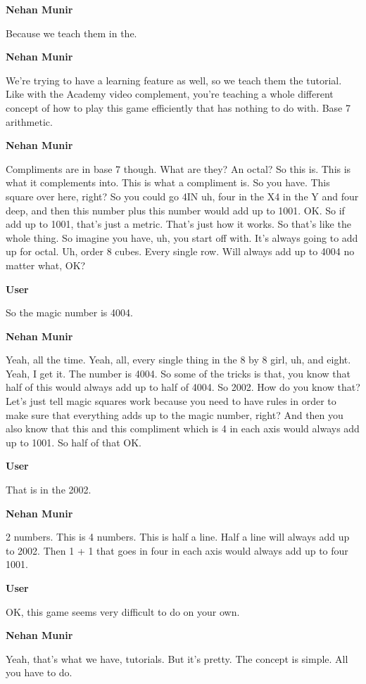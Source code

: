 \documentclass{article}
\begin{document}
\noindent \textbf{Nehan Munir}

Because we teach them in the.

\noindent \textbf{Nehan Munir}

We're trying to have a learning feature as well, so we teach them the tutorial. Like with the Academy video complement, you're teaching a whole different concept of how to play this game efficiently that has nothing to do with. Base 7 arithmetic.

\noindent \textbf{Nehan Munir}

Compliments are in base 7 though. What are they? An octal? So this is. This is what it complements into. This is what a compliment is. So you have. This square over here, right? So you could go 4IN uh, four in the X4 in the Y and four deep, and then this number plus this number would add up to 1001. OK. So if add up to 1001, that's just a metric. That's just how it works. So that's like the whole thing. So imagine you have, uh, you start off with. It's always going to add up for octal. Uh, order 8 cubes. Every single row. Will always add up to 4004 no matter what, OK?

\noindent \textbf{User}

So the magic number is 4004.

\noindent \textbf{Nehan Munir}

Yeah, all the time. Yeah, all, every single thing in the 8 by 8 girl, uh, and eight. Yeah, I get it. The number is 4004. So some of the tricks is that, you know that half of this would always add up to half of 4004. So 2002. How do you know that? Let's just tell magic squares work because you need to have rules in order to make sure that everything adds up to the magic number, right? And then you also know that this and this compliment which is 4 in each axis would always add up to 1001. So half of that OK.

\noindent \textbf{User}

That is in the 2002.

\noindent \textbf{Nehan Munir}

2 numbers. This is 4 numbers. This is half a line. Half a line will always add up to 2002. Then 1 + 1 that goes in four in each axis would always add up to four 1001.

\noindent \textbf{User}

OK, this game seems very difficult to do on your own.

\noindent \textbf{Nehan Munir}

Yeah, that's what we have, tutorials. But it's pretty. The concept is simple. All you have to do.
\end{document}
